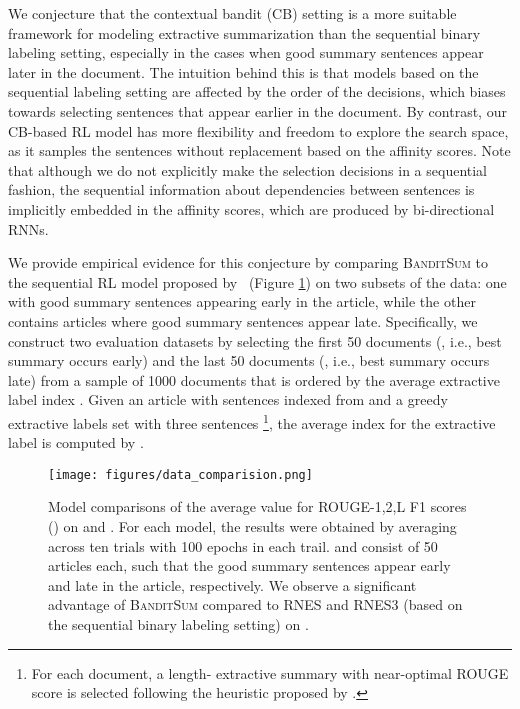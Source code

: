 \documentclass[11pt,a4paper]{article}
\newcommand{\B}{\textsc{BanditSum }}
\begin{document}
We conjecture that the contextual bandit (CB) setting is a more suitable framework for modeling extractive summarization than the sequential binary labeling setting, especially in the cases when good summary sentences appear later in the document. The intuition behind this is that models based on the sequential labeling setting are affected by the order of the decisions, which biases towards selecting sentences that appear earlier in the document. By contrast, our CB-based RL model has more flexibility and freedom to explore the search space, as it samples the sentences without replacement based on the affinity scores. Note that although we do not explicitly make the selection decisions in a sequential fashion, the sequential information about dependencies between sentences is implicitly embedded in the affinity scores, which are produced by bi-directional RNNs.  
 




\newcommand{\Dearly}{\mathit{D}_{\textit{early}}}
\newcommand{\Dlate}{\mathit{D}_{\textit{late}}}

We provide empirical evidence for this conjecture by comparing \B to the sequential RL model proposed by~\citet{DBLP:conf/aaai/WuH18} (Figure \ref{fig:model_comparison}) on two subsets of the data: one with good summary sentences appearing early in the article, while the other contains articles where good summary sentences appear late. Specifically, we construct two evaluation datasets by selecting the first 50 documents (, i.e., best summary occurs early) and the last 50 documents (, i.e., best summary occurs late) from a sample of 1000 documents that is ordered by the average extractive label index \textit{}. Given an article with  sentences indexed from  and a greedy extractive labels set with three sentences \footnote{For each document, a length- extractive summary with near-optimal ROUGE score is selected following the heuristic proposed by \citet{ext5_summarunner}.},  the average index for the extractive label is computed by \textit{}. 


\begin{figure}[!h]
  \texttt{[image: figures/data\_comparision.png]}
  \caption{Model comparisons of the average value for ROUGE-1,2,L F1 scores () on  and . For each model, the results were obtained by averaging   across ten trials with 100 epochs in each trail.  and   consist of 50 articles each, such that the good summary sentences appear early and late in the article, respectively. We observe a significant advantage of \B compared to RNES and RNES3 (based on the sequential binary labeling setting) on .}
  \label{fig:model_comparison}
\end{figure}
\end{document}
